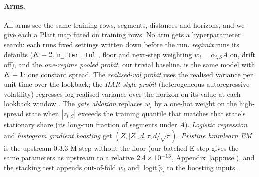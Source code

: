 \documentclass{article}
\begin{document}
\paragraph{Arms.}
All arms see the same training rows, segments, distances and horizons, and we give each a Platt map fitted on training rows.
No arm gets a hyperparameter search: each runs fixed settings written down before the run.
\emph{regimix} runs its defaults ($K=2$, \texttt{n\_iter} \nCfgNIter, \texttt{tol} \nCfgTol, floor and next-step weighting $w_i=\alpha_{i,S}A$ on, drift off), and the \emph{one-regime pooled probit}, our trivial baseline, is the same model with $K=1$: one constant spread.
The \emph{realised-vol probit} uses the realised variance per unit time over the lookback; the \emph{HAR-style probit} (heterogeneous autoregressive volatility) regresses log realised variance over the horizon on its value at each lookback window \citep{corsi2009,andersen2003}.
The \emph{gate ablation} replaces $w_i$ by a one-hot weight on the high-spread state when $|z_{i,S}|$ exceeds the training quantile that matches that state's stationary share (its long-run fraction of segments under $A$).
\emph{Logistic regression} and \emph{histogram gradient boosting} \citep{pedregosa2011} get $(Z,|Z|,d,\tau,d/\sqrt\tau)$.
\emph{Pristine hmmlearn EM} is the upstream 0.3.3 M-step \citep{hmmlearn} without the floor (our batched E-step gives the same parameters as upstream to a relative $2.4\times10^{-13}$, Appendix~\ref{app:use}), and the stacking test \citep{wolpert1992} appends out-of-fold $w_i$ and $\operatorname{logit}\tilde p_i$ to the boosting inputs.
\end{document}
